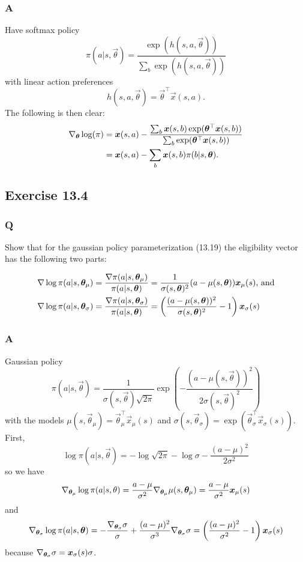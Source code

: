 \subsubsection*{A}
Have softmax policy
\[
    \pi(a \vert{} s, \vec{\theta}) = \frac{\exp(h(s, a, \vec{\theta}))}{\sum_b \exp(h(s, a, \vec{\theta}))}
\]
with linear action preferences 
\[
    h(s, a, \vec{\theta}) = \vec{\theta}^\top \vec{x}(s, a).
\]
The following is then clear:
\begin{align*}
    \nabla_{\boldsymbol{\theta}} \log(\pi) &= \boldsymbol{x}(s, a) - \frac{\sum_b \boldsymbol{x}(s, b) \exp(\boldsymbol{\theta}^\top \boldsymbol{x}(s, b))}{\sum_b \exp(\boldsymbol{\theta}^\top \boldsymbol{x}(s, b))} \\
                                   &= \boldsymbol{x}(s, a) - \sum_b \boldsymbol{x}(s, b) \pi(b \vert{} s, \boldsymbol{\theta}).
\end{align*}

\subsection{Exercise 13.4}
\subsubsection*{Q}
Show that for the gaussian policy parameterization (13.19) the eligibility vector has the following two parts:

\begin{align*}
    \nabla \log \pi(a \vert{} s, \boldsymbol{\theta}_\mu) &= \frac{\nabla \pi(a \vert{} s, \boldsymbol{\theta}_\mu)}{\pi(a \vert{} s, \boldsymbol{\theta})} = \frac{1}{\sigma(s, \boldsymbol{\theta})^2} (a - \mu(s, \boldsymbol{\theta}))\boldsymbol{x}_\mu(s)\text{, and}\\
    \nabla \log \pi(a \vert{} s, \boldsymbol{\theta}_\sigma) &= \frac{\nabla \pi(a \vert{} s, \boldsymbol{\theta}_\sigma)}{\pi(a \vert{} s, \boldsymbol{\theta})} = \left( \frac{(a - \mu(s, \boldsymbol{\theta}))^2}{\sigma(s, \boldsymbol{\theta})^2} - 1 \right) \boldsymbol{x}_\sigma(s)
\end{align*}

\subsubsection*{A}
Gaussian policy
\[
    \pi(a \vert{} s, \vec{\theta}) = \frac{1}{\sigma(s, \vec{\theta}) \sqrt{2 \pi}} \exp\left( - \frac{(a - \mu(s, \vec{\theta}))^2}{2 \sigma(s, \vec{\theta})^2} \right)
\]
with the models $\mu(s, \vec{\theta}_\mu) = \vec{\theta}_\mu^\top\vec{x}_\mu(s)$ and $\sigma(s, \vec{\theta}_\sigma) = \exp(\vec{\theta}_\sigma^\top\vec{x}_\sigma(s))$. First,
\[
    \log \pi(a \vert{} s, \vec{\theta}) = - \log \sqrt{2 \pi} - \log \sigma - \frac{(a - \mu)^2}{2\sigma^2}
\]
so we have 
\[
    \nabla_{\boldsymbol{\theta}_\mu}\log\pi(a \vert{}s, \theta) = \frac{a - \mu}{\sigma^2}\nabla_{\boldsymbol{\theta}_\mu}\mu(s, \boldsymbol{\theta}_\mu) = \frac{a - \mu}{\sigma^2} \boldsymbol{x}_\mu(s)
\]
and
\[
    \nabla_{\boldsymbol{\theta}_\sigma}\log\pi(a \vert{} s, \boldsymbol{\theta}) = - \frac{\nabla_{\boldsymbol{\theta}_\sigma} \sigma}{\sigma} + \frac{(a - \mu)^2}{\sigma^3}\nabla_{\boldsymbol{\theta}_\sigma}\sigma = \left( \frac{(a - \mu)^2}{\sigma^2} - 1 \right)\boldsymbol{x}_\sigma(s) 
\]
because $\nabla_{\boldsymbol{\theta}_\sigma}\sigma = \boldsymbol{x}_\sigma(s) \sigma$.


